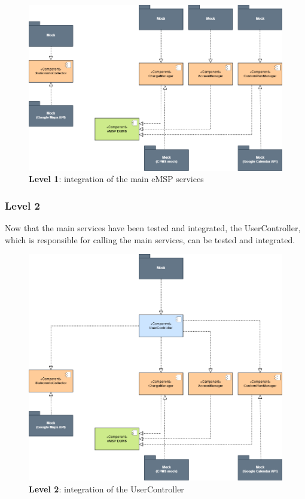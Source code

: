 \documentclass[12pt]{report}
\begin{document}
\bigskip
\begin{figure}[ht]
    \centering
    \includegraphics[width=\textwidth]{assets/level1_emsp_integration.png}
    \caption{\textbf{Level 1}: integration of the main eMSP services}
    \label{fig:my_label40}
\end{figure}
\clearpage

\subsubsection{Level 2}
Now that the main services have been tested and integrated, the UserController, which is responsible for calling the main services, can be tested and integrated.

\bigskip
\begin{figure}[ht]
    \centering
    \includegraphics[width=\textwidth]{assets/level2_emsp_integration.png}
    \caption{\textbf{Level 2}: integration of the UserController}
    \label{fig:my_label42333333}
\end{figure}
\clearpage
\end{document}
